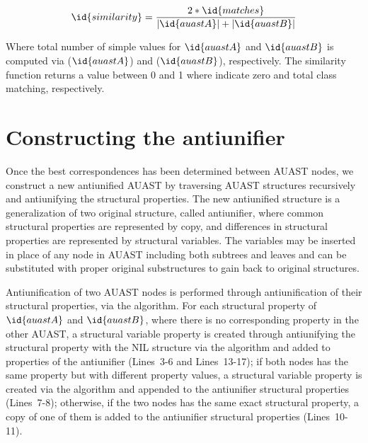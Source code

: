 \begin{equation}\label{eq1}
\id{similarity} = \frac{2*\id{matches}}{|\id{auastA}| + |\id{auastB}|}
\end{equation}

Where total number of simple values for $\id{auastA}$ and $\id{auastB}$ is computed via ($\id{auastA}$) and ($\id{auastB}$), respectively. The similarity function returns a value between 0 and 1 where indicate zero and total class matching, respectively.


\section{Constructing the antiunifier} \label{meth-antiUnifier}
Once the best correspondences has been determined between AUAST nodes, we construct a new antiunified AUAST by traversing AUAST structures recursively and antiunifying the structural properties. The new antiunified structure is a generalization of two original structure, called antiunifier, where common structural properties are represented by copy, and differences in structural properties are represented by structural variables. The variables may be inserted in place of any node in AUAST including both subtrees and leaves and can be substituted with proper original substructures to gain back to original structures.

Antiunification of two AUAST nodes is performed through antiunification of their structural properties, via the  algorithm. For each structural property of $\id{auastA}$ and $\id{auastB}$, where there is no corresponding property in the other AUAST, a structural variable property is created through antiunifying the structural property with the NIL structure via the  algorithm and added to properties of the antiunifier (Lines~3-6 and Lines~13-17); if both nodes has the same property but with different property values, a structural variable property is created via the  algorithm and appended to the antiunifier structural properties (Lines~7-8); otherwise, if the two nodes has the same exact structural property, a copy of one of them is added to the antiunifier structural properties (Lines~10-11).


